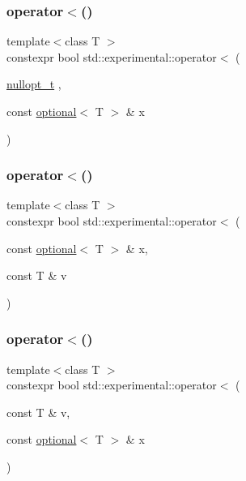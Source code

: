 \subsubsection{\texorpdfstring{operator$<$()}{operator<()}\hspace{0.1cm}{\footnotesize\ttfamily [3/9]}}
{\footnotesize\ttfamily template$<$class T $>$ \\
constexpr bool std\+::experimental\+::operator$<$ (\begin{DoxyParamCaption}\item[{\mbox{\hyperlink{structstd_1_1experimental_1_1nullopt__t}{nullopt\+\_\+t}}}]{,  }\item[{const \mbox{\hyperlink{classstd_1_1experimental_1_1optional}{optional}}$<$ T $>$ \&}]{x }\end{DoxyParamCaption})\hspace{0.3cm}{\ttfamily [noexcept]}}

\mbox{\label{namespacestd_1_1experimental_acd496ce7fb815b5ed07c64c3c50473a5}} 
\subsubsection{\texorpdfstring{operator$<$()}{operator<()}\hspace{0.1cm}{\footnotesize\ttfamily [4/9]}}
{\footnotesize\ttfamily template$<$class T $>$ \\
constexpr bool std\+::experimental\+::operator$<$ (\begin{DoxyParamCaption}\item[{const \mbox{\hyperlink{classstd_1_1experimental_1_1optional}{optional}}$<$ T $>$ \&}]{x,  }\item[{const T \&}]{v }\end{DoxyParamCaption})}

\mbox{\label{namespacestd_1_1experimental_a1d3cd046025f9693e0c6c7e57c67e379}} 
\subsubsection{\texorpdfstring{operator$<$()}{operator<()}\hspace{0.1cm}{\footnotesize\ttfamily [5/9]}}
{\footnotesize\ttfamily template$<$class T $>$ \\
constexpr bool std\+::experimental\+::operator$<$ (\begin{DoxyParamCaption}\item[{const T \&}]{v,  }\item[{const \mbox{\hyperlink{classstd_1_1experimental_1_1optional}{optional}}$<$ T $>$ \&}]{x }\end{DoxyParamCaption})}

